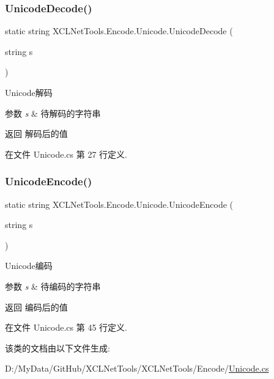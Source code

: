 \subsubsection{\texorpdfstring{Unicode\+Decode()}{UnicodeDecode()}}
{\footnotesize\ttfamily static string X\+C\+L\+Net\+Tools.\+Encode.\+Unicode.\+Unicode\+Decode (\begin{DoxyParamCaption}\item[{string}]{s }\end{DoxyParamCaption})\hspace{0.3cm}{\ttfamily [static]}}



Unicode解码 


\begin{DoxyParams}{参数}
{\em s} & 待解码的字符串\\
\hline
\end{DoxyParams}
\begin{DoxyReturn}{返回}
解码后的值
\end{DoxyReturn}


在文件 Unicode.\+cs 第 27 行定义.

\mbox{\label{class_x_c_l_net_tools_1_1_encode_1_1_unicode_afbe245ddbaa5d6364985380483f2f8ba}} 
\subsubsection{\texorpdfstring{Unicode\+Encode()}{UnicodeEncode()}}
{\footnotesize\ttfamily static string X\+C\+L\+Net\+Tools.\+Encode.\+Unicode.\+Unicode\+Encode (\begin{DoxyParamCaption}\item[{string}]{s }\end{DoxyParamCaption})\hspace{0.3cm}{\ttfamily [static]}}



Unicode编码 


\begin{DoxyParams}{参数}
{\em s} & 待编码的字符串\\
\hline
\end{DoxyParams}
\begin{DoxyReturn}{返回}
编码后的值
\end{DoxyReturn}


在文件 Unicode.\+cs 第 45 行定义.



该类的文档由以下文件生成\+:\begin{DoxyCompactItemize}
\item 
D\+:/\+My\+Data/\+Git\+Hub/\+X\+C\+L\+Net\+Tools/\+X\+C\+L\+Net\+Tools/\+Encode/\hyperlink{_unicode_8cs}{Unicode.\+cs}\end{DoxyCompactItemize}
